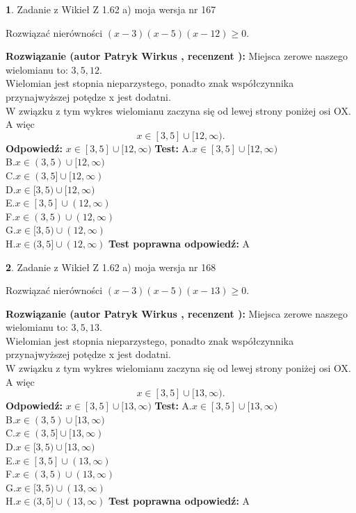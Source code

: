 \documentclass[12pt, a4paper]{article}
\theoremstyle{definition} %
\newtheorem{zad}{}
\newcommand{\zadStart}[1]{\begin{zad}#1\newline}
\newcommand{\zadStop}{\end{zad}}
\newcommand{\rozwStart}[2]{\noindent \textbf{Rozwiązanie (autor #1 , recenzent #2): }\newline}
\newcommand{\rozwStop}{\newline}
\newcommand{\odpStart}{\noindent \textbf{Odpowiedź:}\newline}
\newcommand{\odpStop}{\newline}
\newcommand{\testStart}{\noindent \textbf{Test:}\newline}
\newcommand{\testStop}{\newline}
\newcommand{\kluczStart}{\noindent \textbf{Test poprawna odpowiedź:}\newline}
\newcommand{\kluczStop}{\newline}
\begin{document}
\zadStart{Zadanie z Wikieł Z 1.62 a) moja wersja nr 167}

Rozwiązać nierówności $(x-3)(x-5)(x-12)\ge0$.
\zadStop
\rozwStart{Patryk Wirkus}{}
Miejsca zerowe naszego wielomianu to: $3, 5, 12$.\\
Wielomian jest stopnia nieparzystego, ponadto znak współczynnika przy\linebreak najwyższej potędze x jest dodatni.\\ W związku z tym wykres wielomianu zaczyna się od lewej strony poniżej osi OX. A więc $$x \in [3,5] \cup [12,\infty).$$
\rozwStop
\odpStart
$x \in [3,5] \cup [12,\infty)$
\odpStop
\testStart
A.$x \in [3,5] \cup [12,\infty)$\\
B.$x \in (3,5) \cup [12,\infty)$\\
C.$x \in (3,5] \cup [12,\infty)$\\
D.$x \in [3,5) \cup [12,\infty)$\\
E.$x \in [3,5] \cup (12,\infty)$\\
F.$x \in (3,5) \cup (12,\infty)$\\
G.$x \in [3,5) \cup (12,\infty)$\\
H.$x \in (3,5] \cup (12,\infty)$
\testStop
\kluczStart
A
\kluczStop



\zadStart{Zadanie z Wikieł Z 1.62 a) moja wersja nr 168}

Rozwiązać nierówności $(x-3)(x-5)(x-13)\ge0$.
\zadStop
\rozwStart{Patryk Wirkus}{}
Miejsca zerowe naszego wielomianu to: $3, 5, 13$.\\
Wielomian jest stopnia nieparzystego, ponadto znak współczynnika przy\linebreak najwyższej potędze x jest dodatni.\\ W związku z tym wykres wielomianu zaczyna się od lewej strony poniżej osi OX. A więc $$x \in [3,5] \cup [13,\infty).$$
\rozwStop
\odpStart
$x \in [3,5] \cup [13,\infty)$
\odpStop
\testStart
A.$x \in [3,5] \cup [13,\infty)$\\
B.$x \in (3,5) \cup [13,\infty)$\\
C.$x \in (3,5] \cup [13,\infty)$\\
D.$x \in [3,5) \cup [13,\infty)$\\
E.$x \in [3,5] \cup (13,\infty)$\\
F.$x \in (3,5) \cup (13,\infty)$\\
G.$x \in [3,5) \cup (13,\infty)$\\
H.$x \in (3,5] \cup (13,\infty)$
\testStop
\kluczStart
A
\kluczStop
\end{document}
